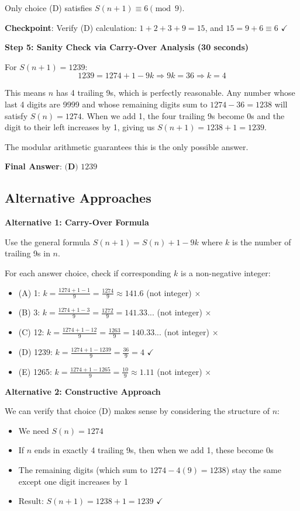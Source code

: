 \documentclass[]{article}
\begin{document}
\begin{solutionbox}
Only choice (D) satisfies $S(n+1) \equiv 6 \pmod{9}$.

\textbf{Checkpoint}: Verify (D) calculation: $1+2+3+9 = 15$, and $15 = 9 + 6 \equiv 6$ $\checkmark$

\textbf{Step 5: Sanity Check via Carry-Over Analysis (30 seconds)}

For $S(n+1) = 1239$:
\[1239 = 1274 + 1 - 9k \Rightarrow 9k = 36 \Rightarrow k = 4\]

This means $n$ has 4 trailing 9s, which is perfectly reasonable. Any number whose last 4 digits are 9999 and whose remaining digits sum to $1274 - 36 = 1238$ will satisfy $S(n) = 1274$. When we add 1, the four trailing 9s become 0s and the digit to their left increases by 1, giving us $S(n+1) = 1238 + 1 = 1239$.

The modular arithmetic guarantees this is the only possible answer.

\textbf{Final Answer}: $\boxed{\textbf{(D) } 1239}$

\subsection*{Alternative Approaches}

\textbf{Alternative 1: Carry-Over Formula}

Use the general formula $S(n+1) = S(n) + 1 - 9k$ where $k$ is the number of trailing 9s in $n$.

For each answer choice, check if corresponding $k$ is a non-negative integer:
\begin{itemize}
    \item (A) 1: $k = \frac{1274+1-1}{9} = \frac{1274}{9} \approx 141.6$ (not integer) $\times$
    \item (B) 3: $k = \frac{1274+1-3}{9} = \frac{1272}{9} = 141.33...$ (not integer) $\times$
    \item (C) 12: $k = \frac{1274+1-12}{9} = \frac{1263}{9} = 140.33...$ (not integer) $\times$
    \item (D) 1239: $k = \frac{1274+1-1239}{9} = \frac{36}{9} = 4$ $\checkmark$
    \item (E) 1265: $k = \frac{1274+1-1265}{9} = \frac{10}{9} \approx 1.11$ (not integer) $\times$
\end{itemize}

\textbf{Alternative 2: Constructive Approach}

We can verify that choice (D) makes sense by considering the structure of $n$:
\begin{itemize}
    \item We need $S(n) = 1274$
    \item If $n$ ends in exactly 4 trailing 9s, then when we add 1, these become 0s
    \item The remaining digits (which sum to $1274 - 4(9) = 1238$) stay the same except one digit increases by 1
    \item Result: $S(n+1) = 1238 + 1 = 1239$ $\checkmark$
\end{itemize}


\end{solutionbox}
\end{document}
